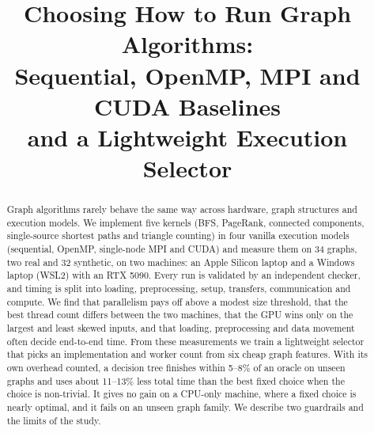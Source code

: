 \documentclass[conference]{IEEEtran}
\begin{document}
\title{Choosing How to Run Graph Algorithms:\\
Sequential, OpenMP, MPI and CUDA Baselines\\
and a Lightweight Execution Selector}

\author{%
\and
{}
\and
{}
}

\maketitle

\begin{abstract}
Graph algorithms rarely behave the same way across hardware, graph structures and execution models. We implement five kernels (BFS, PageRank, connected components, single-source shortest paths and triangle counting) in four vanilla execution models (sequential, OpenMP, single-node MPI and CUDA) and measure them on 34 graphs, two real and 32 synthetic, on two machines: an Apple Silicon laptop and a Windows laptop (WSL2) with an RTX 5090. Every run is validated by an independent checker, and timing is split into loading, preprocessing, setup, transfers, communication and compute. We find that parallelism pays off above a modest size threshold, that the best thread count differs between the two machines, that the GPU wins only on the largest and least skewed inputs, and that loading, preprocessing and data movement often decide end-to-end time. From these measurements we train a lightweight selector that picks an implementation and worker count from six cheap graph features. With its own overhead counted, a decision tree finishes within 5--8\% of an oracle on unseen graphs and uses about 11--13\% less total time than the best fixed choice when the choice is non-trivial. It gives no gain on a CPU-only machine, where a fixed choice is nearly optimal, and it fails on an unseen graph family. We describe two guardrails and the limits of the study.
\end{abstract}
\end{document}
